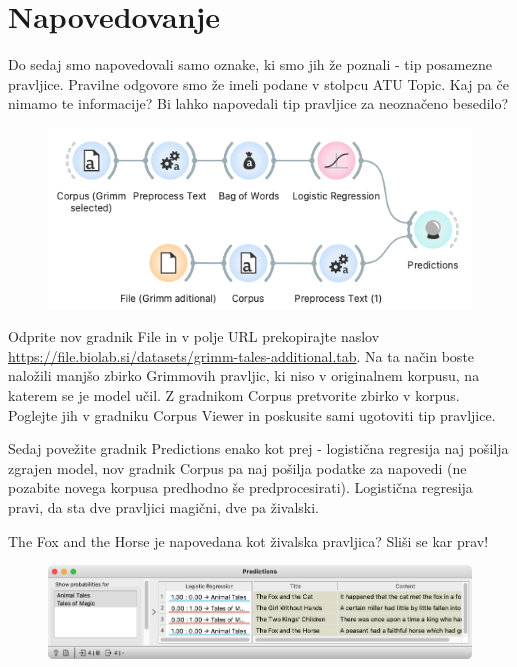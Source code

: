 \chapter{Napovedovanje}
\label{ch:text-napovedovanje}

Do sedaj smo napovedovali samo oznake, ki smo jih že poznali - tip posamezne pravljice. Pravilne odgovore smo že imeli podane v stolpcu ATU Topic. Kaj pa če nimamo te informacije? Bi lahko napovedali tip pravljice za neoznačeno besedilo?

\begin{figure}[h]
    \includegraphics[width=\linewidth]{napovedovanje-workflow.png}%
    \caption{ }
    \label{fig:002-preprocess}
\end{figure}

Odprite nov gradnik File in v polje URL prekopirajte naslov \url{https://file.biolab.si/datasets/grimm-tales-additional.tab}. Na ta način boste naložili manjšo zbirko Grimmovih pravljic, ki niso v originalnem korpusu, na katerem se je model učil. Z gradnikom Corpus pretvorite zbirko v korpus. Poglejte jih v gradniku Corpus Viewer in poskusite sami ugotoviti tip pravljice.

Sedaj povežite gradnik Predictions enako kot prej - logistična regresija naj pošilja zgrajen model, nov gradnik Corpus pa naj pošilja podatke za napovedi (ne pozabite novega korpusa predhodno še predprocesirati). Logistična regresija pravi, da sta dve pravljici magični, dve pa živalski.

The Fox and the Horse je napovedana kot živalska pravljica? Sliši se kar prav!

\begin{figure}[h]
    \centering
    \includegraphics[width=\linewidth]{napovedovanje-predictions.png}%
    \caption{}
    \label{fig:002-word-cloud}
\end{figure}